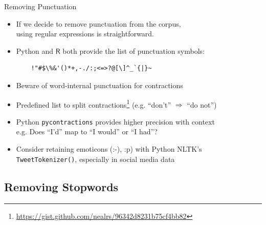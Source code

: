 \documentclass{beamer}
\renewcommand{\cite}{\citep}
\begin{document}

\begin{frame}[fragile]{Removing Punctuation}
\begin{itemize}
\item If we decide to remove punctuation from the corpus,\\ 
	using regular expressions is straightforward.
\item Python and $\mathsf{R}$ both provide the list of punctuation symbols:\\ 
	\begin{verbatim} 
	!"#$\%&'()*+,-./:;<=>?@[\]^_`{|}~ 
	\end{verbatim}
	\bigskip
\item Beware of word-internal punctuation for contractions
\item Predefined list to split contractions\footnote{\url{https://gist.github.com/nealrs/96342d8231b75cf4bb82}} (e.g. ``don't'' $\Rightarrow$ ``do not'')
\item Python \texttt{pycontractions} provides higher precision with context\\
	e.g. Does ``I'd'' map to ``I would'' or ``I had''?~\cite{pycontractions}
	\bigskip
\item Consider retaining emoticons (:-), :p) with Python NLTK's \texttt{TweetTokenizer()}, especially in social media data
\end{itemize}
\end{frame}

\subsection{Removing Stopwords}
\end{document}
